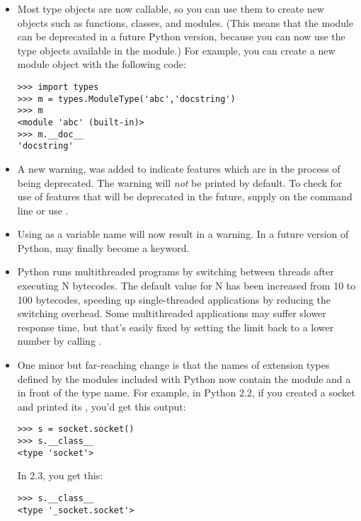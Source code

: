 \documentclass{howto}
\begin{document}
\begin{itemize}
\item Most type objects are now callable, so you can use them
to create new objects such as functions, classes, and modules.  (This
means that the  module can be deprecated in a future
Python version, because you can now use the type objects available
in the  module.)
For example, you can create a new module object with the following code:

\begin{verbatim}
>>> import types
>>> m = types.ModuleType('abc','docstring')
>>> m
<module 'abc' (built-in)>
>>> m.__doc__
'docstring'
\end{verbatim}

\item 
A new warning,  was added to
indicate features which are in the process of being
deprecated.  The warning will \emph{not} be printed by default.  To
check for use of features that will be deprecated in the future,
supply  on the
command line or use .

\item Using  as a variable name will now result in a
 warning.  In a future version of Python,
 may finally become a keyword.

\item Python runs multithreaded programs by switching between threads
after executing N bytecodes.  The default value for N has been
increased from 10 to 100 bytecodes, speeding up single-threaded
applications by reducing the switching overhead.  Some multithreaded
applications may suffer slower response time, but that's easily fixed
by setting the limit back to a lower number by calling
.

\item One minor but far-reaching change is that the names of extension
types defined by the modules included with Python now contain the
module and a  in front of the type name.  For example, in
Python 2.2, if you created a socket and printed its
, you'd get this output:

\begin{verbatim}
>>> s = socket.socket()
>>> s.__class__
<type 'socket'>
\end{verbatim}

In 2.3, you get this:
\begin{verbatim}
>>> s.__class__
<type '_socket.socket'>
\end{verbatim}

\end{itemize}
\end{document}
